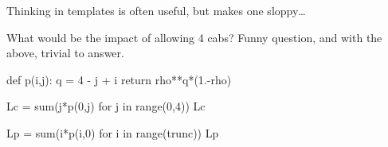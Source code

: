 \begin{exercise}
\begin{solution}
Thinking in templates is often useful, but makes one sloppy\ldots

What would be the impact of allowing 4 cabs? Funny question, and with the above, trivial to answer.

\begin{pyconsole}
def p(i,j):
    q  = 4 - j + i
    return rho**q*(1.-rho)
  
\end{pyconsole}

\begin{pyconsole}
Lc = sum(j*p(0,j) for j in range(0,4))
Lc

Lp = sum(i*p(i,0) for i in range(trunc))
Lp
  
\end{pyconsole}
    \end{solution}
\end{exercise}



\begin{comment}
  
\begin{exercise}[use=false]
  Include an question that shows that it is necessary to check the
  guess for the product form solution everywhere on the state space,
  that is, in the interior, but also on the boundaries.
  \begin{solution}
    TBD
  \end{solution}
\end{exercise}

\begin{exercise}[use=false]
  Apply the formula's of Zijm.Section 2.4 to a tandem queueing network.
  \begin{solution}
    TBD.
  \end{solution}
\end{exercise}

\begin{exercise}[use=false]
  Include a case for Section 2.4.
  \begin{solution}
    TBD.
  \end{solution}
\end{exercise}
\end{comment}






